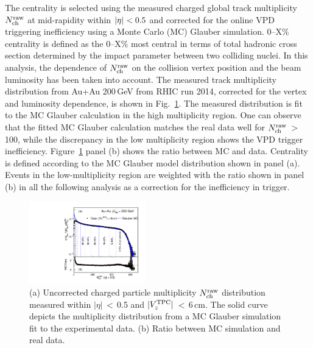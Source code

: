 \documentclass[%
 reprint,	
 amsmath,amssymb,
 aps,
 prc,
]{revtex4-1}
\begin{document}
The centrality is selected using the measured charged global track multiplicity $N_{\rm ch}^{\rm raw}$ at mid-rapidity within $|\eta|\ \rm{ < 0.5}$ and corrected for the online VPD triggering inefficiency using a Monte Carlo (MC) Glauber simulation. 0--X\% centrality is defined as the 0--X\% most central in terms of total hadronic cross section determined by the impact parameter between two colliding nuclei. In this analysis, the dependence of $N_{\rm ch}^{\rm raw}$ on the collision vertex position and the beam luminosity has been taken into account. The measured track multiplicity distribution from Au+Au 200\,GeV from RHIC run 2014, corrected for the vertex and luminosity dependence, is shown in Fig.~\ref{fig:centrality}. The measured distribution is fit to the MC Glauber calculation in the high multiplicity region. One can observe that the fitted MC Glauber calculation matches the real data well for $N_{\rm ch}^{\rm raw}$\,$>$\,100, while the discrepancy in the low multiplicity region shows the VPD trigger inefficiency. Figure~\ref{fig:centrality} panel (b) shows the ratio between MC and data. Centrality is defined according to the MC Glauber model distribution shown in panel (a). Events in the low-multiplicity region are weighted with the ratio shown in panel (b) in all the following analysis as a correction for the inefficiency in trigger. 

\begin{figure}[h]
\centering
\includegraphics[width=0.45\textwidth]{fig/centrality.pdf}
  \caption{(a) Uncorrected charged particle multiplicity $N_{\rm ch}^{\rm raw}$ distribution measured within $|\eta|$\,$<$\,0.5 and $|V_z^{\rm{TPC}}|$\,$<$\,6\,cm. The solid curve depicts the multiplicity distribution from a MC Glauber simulation fit to the experimental data. (b) Ratio between MC simulation and real data.}
\label{fig:centrality} 
\end{figure}
\end{document}
